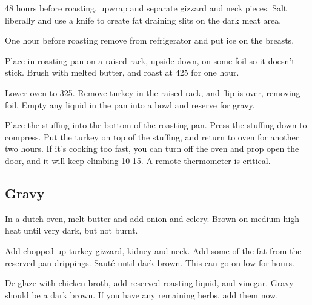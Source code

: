 \begin{recipe}
48 hours before roasting, upwrap and separate gizzard and neck pieces. Salt liberally and use a knife to create fat draining slits on the dark meat area. 

One hour before roasting remove from refrigerator and put ice on the breasts. 

Place in roasting pan on a raised rack, upside down, on some foil so it doesn't stick. Brush with melted butter, and roast at 425\degree{} for one hour.

Lower oven to 325\degree{}. Remove turkey in the raised rack, and flip is over, removing foil. Empty any liquid in the pan into a bowl and reserve for gravy.

Place the stuffing into the bottom of the roasting pan. Press the stuffing down to compress. Put the  turkey on top of the stuffing, and return to oven for another two hours. If it's cooking too fast, you can turn off the oven and prop open the door, and it will keep climbing 10-15\degree{}. A remote thermometer is critical. 

\newpage
\subsection{Gravy}



In a dutch oven, melt butter and add onion and celery. Brown on medium high heat until very dark, but not burnt.

Add chopped up turkey gizzard, kidney and neck. Add some of the fat from the reserved pan drippings. Sauté until dark brown. This can go on low for hours.


De glaze with chicken broth, add reserved roasting liquid, and vinegar. Gravy should be a dark brown. If you have any remaining herbs, add them now.


\end{recipe}
